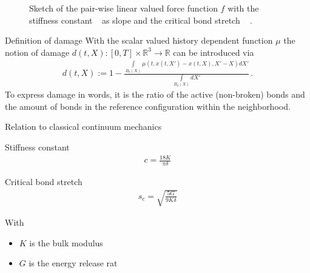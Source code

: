 \documentclass[\classoption]{beamer}
\newcommand{\R}{\mathbb{R}}
\newcommand{\args}{(t,x(t,X')-x(t,X),X'-X)}
\begin{document}
\begin{frame}{}
\begin{figure}[H]
\caption[Sketch of the pair-wise linear valued force function $f$ with the stiffness constant $c$ as slope and the critical bond stretch $s_c$.]{Sketch of the pair-wise linear valued force function $f$ with the stiffness constant \textcolor{azure}{$c$} as slope and the critical bond stretch \textcolor{azure}{$s_c$}.}
\label{fig::force::sketch::critical}
\end{figure}
\end{frame}

\begin{frame}{Definition of damage}
With the scalar valued history dependent function $\mu$ the notion of damage $d(t,X):[0,T]\times\R^3\rightarrow\R$ can be introduced via
\begin{align*}
d(t,X):= 1- \frac{\displaystyle\int\limits_{B_\delta(X)}\mu\args dX'}{\displaystyle\int\limits_{B_\delta(X)}dX'}\,\text{.}
\label{eq::damage:nodal}
\end{align*}
To express damage in words, it is the ratio of the active (non-broken) bonds and the amount of bonds in the reference configuration within the neighborhood.
\end{frame}



\begin{frame}{Relation to classical continuum mechanics}
\begin{block}{Stiffness constant}
\begin{align*}
c = \frac{18K}{\pi\delta}
\end{align*}
\end{block}
\vspace{-0.25cm}
\begin{block}{Critical bond stretch}
\begin{align*}
s_c =  \sqrt{\frac{5G}{9K\delta}}
\end{align*}
\end{block}
\vspace{-0.25cm}
With
\begin{itemize}
\item $K$ is the bulk modulus
\item $G$ is the energy release rat
\end{itemize}
\end{frame}
\end{document}
